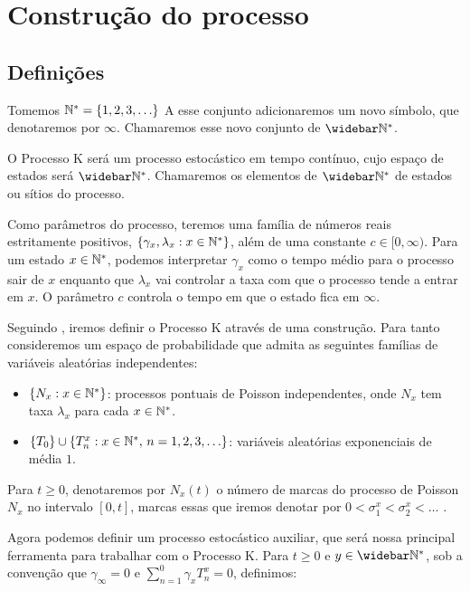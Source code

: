 \chapter{Construção do processo}
\label{cap:construcao}

\section{Definições}
\label{sec:definicoes}

Tomemos ${\mathbb{N^*}} = \{ 1, 2, 3, \ldots\}$ A esse conjunto adicionaremos um
novo símbolo, que denotaremos por $\infty$. Chamaremos esse novo
conjunto de $\Nzb$.

O Processo K será um processo estocástico em tempo contínuo, cujo
espaço de estados será $\Nzb$. Chamaremos os elementos de $\Nzb$ de
estados ou sítios do processo.

Como parâmetros do processo, teremos uma família de números reais
estritamente positivos, $\{\gamma_x, \lambda_x : x \in {\mathbb{N^*}}\}$, além de
uma constante $c \in [0, \infty)$.  Para um estado $x \in {\mathbb{N^*}}$,
podemos interpretar $\gamma_x$ como o tempo médio para o processo sair
de $x$ enquanto que $\lambda_x$ vai controlar a taxa com que o
processo tende a entrar em $x$. O parâmetro $c$ controla o tempo em
que o estado fica em $\infty$.

Seguindo \cite{fontes:08}, iremos definir o Processo K através de uma
construção. Para tanto consideremos um espaço de probabilidade que
admita as seguintes famílias de variáveis aleatórias independentes:

\begin{itemize}
\item $\{ N_x: x \in {\mathbb{N^*}} \}$: processos pontuais de Poisson
  independentes, onde $N_x$ tem taxa $\lambda_x$ para cada $x \in {\mathbb{N^*}}$.
\item $\{T_0\} \cup \{T_n^x: x \in {\mathbb{N^*}} , \, n = 1, 2, 3, \ldots \}$:
  variáveis aleatórias exponenciais de média $1$.
\end{itemize}

Para $t \geq 0$, denotaremos por $N_x(t)$ o número de marcas do
processo de Poisson $N_x$ no intervalo $[0, t]$, marcas essas que
iremos denotar por $0 < \sigma_1^x < \sigma_2^x < \ldots$ .

Agora podemos definir um processo estocástico auxiliar, que será nossa
principal ferramenta para trabalhar com o Processo K. Para $t \geq 0$
e $y \in \Nzb$, sob a convenção que $\gamma_\infty = 0$ e
$\sum_{n=1}^{0} \gamma_x T_n^x = 0$, definimos:

